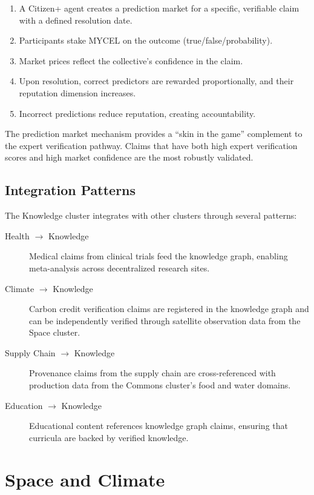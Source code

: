 \documentclass[12pt]{book}
\begin{document}
\begin{enumerate}
  \item A Citizen+ agent creates a prediction market for a specific, verifiable
    claim with a defined resolution date.
  \item Participants stake MYCEL on the outcome (true/false/probability).
  \item Market prices reflect the collective's confidence in the claim.
  \item Upon resolution, correct predictors are rewarded proportionally,
    and their reputation dimension increases.
  \item Incorrect predictions reduce reputation, creating accountability.
\end{enumerate}

The prediction market mechanism provides a ``skin in the game'' complement to
the expert verification pathway. Claims that have both high expert verification
scores and high market confidence are the most robustly validated.

\section{Integration Patterns}

The Knowledge cluster integrates with other clusters through several patterns:

\begin{description}
  \item[Health $\to$ Knowledge] Medical claims from clinical trials feed
    the knowledge graph, enabling meta-analysis across decentralized
    research sites.
  \item[Climate $\to$ Knowledge] Carbon credit verification claims are
    registered in the knowledge graph and can be independently verified
    through satellite observation data from the Space cluster.
  \item[Supply Chain $\to$ Knowledge] Provenance claims from the supply
    chain are cross-referenced with production data from the Commons
    cluster's food and water domains.
  \item[Education $\to$ Knowledge] Educational content references knowledge
    graph claims, ensuring that curricula are backed by verified knowledge.
\end{description}


\chapter{Space and Climate}
\end{document}
